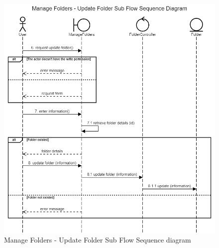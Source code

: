 \begin{figure}[H]
    \centering
    \includegraphics[width=1.0\textwidth]{images/Manage Folders - Update Folder Sub Flow Sequence Diagram.png}
    \caption{Manage Folders - Update Folder Sub Flow Sequence diagram}
    \label{fig:SeqFoldersUpdate}
\end{figure}

